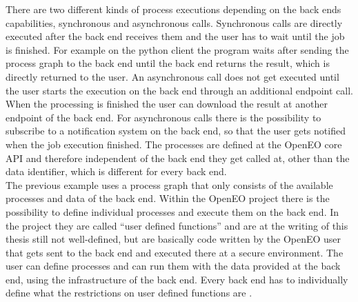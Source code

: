 \documentclass[draft,final]{vutinfth} %
\begin{document}
There are two different kinds of process executions depending on the back ends capabilities, synchronous and asynchronous calls. Synchronous calls are directly executed after the back end receives them and the user has to wait until the job is finished. For example on the python client the program waits after sending the process graph to the back end until the back end returns the result, which is directly returned to the user. An asynchronous call does not get executed until the user starts the execution on the back end through an additional endpoint call. When the processing is finished the user can download the result at another endpoint of the back end. For asynchronous calls there is the possibility to subscribe to a notification system on the back end, so that the user gets notified when the job execution finished.     
The processes are defined at the OpenEO core API and therefore independent of the back end they get called at, other than the data identifier, which is different for every back end.  
\\
The previous example uses a process graph that only consists of the available processes and data of the back end. Within the OpenEO project there is the possibility to define individual processes and execute them on the back end. In the project they are called “user defined functions” and are at the writing of this thesis still not well-defined, but are basically code written by the OpenEO user that gets sent to the back end and executed there at a secure environment. The user can define processes and can run them with the data provided at the back end, using the infrastructure of the back end. Every back end has to individually define what the restrictions on user defined functions are \cite{eodc_github}. 
\end{document}
